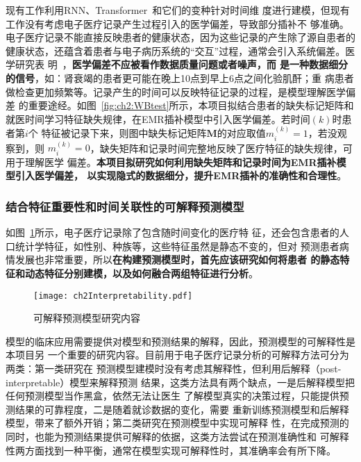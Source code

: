 现有工作利用RNN、Transformer~和它们的变种针对时间维
度进行建模，但现有工作没有考虑电子医疗记录产生过程引入的医学偏差，导致部分插补不
够准确。电子医疗记录不能直接反映患者的健康状态，因为这些记录的产生除了源自患者的
健康状态，还蕴含着患者与电子病历系统的“交互”过程，通常会引入系统偏差。医学研究表
明~，\textbf{医学偏差不应被看作数据质量问题或者噪声，而
是一种数据细分的信号}，如：肾衰竭的患者更可能在晚上10点到早上6点之间化验肌酐；重
病患者做检查更加频繁等。记录产生的时间可以反映特征记录的过程，是模型理解医学偏差
的重要途经。如图~\ref{fig:ch2:WBtest}所示，本项目拟结合患者的缺失标记矩阵和
就医时间学习特征缺失规律，在EMR插补模型中引入医学偏差。若时间$(k)$时患者第$i$个
特征被记录下来，则图中缺失标记矩阵$\bm M$的对应取值$m_i^{(k)}=1$，若没观察到，则
$m_i^{(k)}=0$，缺失矩阵和记录时间完整地反映了医疗特征的缺失规律，可用于理解医学
偏差。\textbf{本项目拟研究如何利用缺失矩阵和记录时间为EMR插补模型引入医学偏差，
以实现隐式的数据细分，提升EMR插补的准确性和合理性}。

\subsubsection{结合特征重要性和时间关联性的可解释预测模型}

如图~\ref{fig:ch2:interpretability}所示，电子医疗记录除了包含随时间变化的医疗特
征，还会包含患者的人口统计学特征，如性别、种族等，这些特征虽然是静态不变的，但对
预测患者病情发展也非常重要，所以\textbf{在构建预测模型时，首先应该研究如何将患者
的静态特征和动态特征分别建模，以及如何融合两组特征进行分析}。

\begin{figure}
    \begin{small}
        \begin{center}
            \texttt{[image: ch2Interpretability.pdf]}
        \end{center}
        \caption{可解释预测模型研究内容}
        \label{fig:ch2:interpretability}
    \end{small}
\end{figure}

模型的临床应用需要提供对模型和预测结果的解释，因此，预测模型的可解释性是本项目另
一个重要的研究内容。目前用于电子医疗记录分析的可解释方法可分为两类：第一类研究在
预测模型建模时没有考虑其解释性，但利用后解释（post-interpretable）模型来解释预测
结果，这类方法具有两个缺点，一是后解释模型把任何预测模型当作黑盒，依然无法让医生
了解模型真实的决策过程，只能提供预测结果的可靠程度，二是随着就诊数据的变化，需要
重新训练预测模型和后解释模型，带来了额外开销；第二类研究在预测模型中实现可解释
性，在完成预测的同时，也能为预测结果提供可解释的依据，这类方法尝试在预测准确性和
可解释性两方面找到一种平衡，通常在模型实现可解释性时，其准确率会有所下降。

